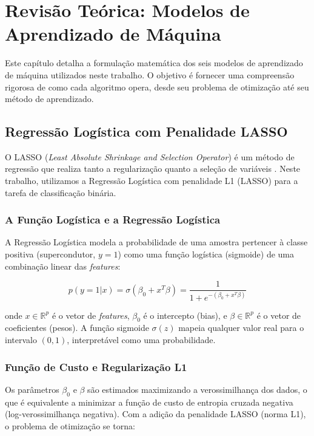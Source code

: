 \documentclass[12pt, a4paper, oneside]{report}
\begin{document}
\chapter{Revisão Teórica: Modelos de Aprendizado de Máquina}
\label{chap:ml}

Este capítulo detalha a formulação matemática dos seis modelos de aprendizado de máquina utilizados neste trabalho. O objetivo é fornecer uma compreensão rigorosa de como cada algoritmo opera, desde seu problema de otimização até seu método de aprendizado.

\section{Regressão Logística com Penalidade LASSO}

O LASSO (\textit{Least Absolute Shrinkage and Selection Operator}) é um método de regressão que realiza tanto a regularização quanto a seleção de variáveis \cite{tibshirani1996}. Neste trabalho, utilizamos a Regressão Logística com penalidade L1 (LASSO) para a tarefa de classificação binária.

\subsection{A Função Logística e a Regressão Logística}

A Regressão Logística modela a probabilidade de uma amostra pertencer à classe positiva (supercondutor, $y=1$) como uma função logística (sigmoide) de uma combinação linear das \textit{features}:

\begin{equation}
    p(y=1|x) = \sigma(\beta_0 + x^T \beta) = \frac{1}{1 + e^{-(\beta_0 + x^T \beta)}}
\end{equation}

onde $x \in \mathbb{R}^p$ é o vetor de \textit{features}, $\beta_0$ é o intercepto (bias), e $\beta \in \mathbb{R}^p$ é o vetor de coeficientes (pesos). A função sigmoide $\sigma(z)$ mapeia qualquer valor real para o intervalo $(0, 1)$, interpretável como uma probabilidade.

\subsection{Função de Custo e Regularização L1}

Os parâmetros $\beta_0$ e $\beta$ são estimados maximizando a verossimilhança dos dados, o que é equivalente a minimizar a função de custo de entropia cruzada negativa (log-verossimilhança negativa). Com a adição da penalidade LASSO (norma L1), o problema de otimização se torna:
\end{document}
